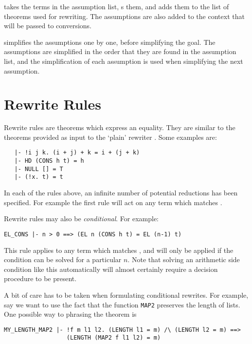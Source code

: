  takes the terms in the assumption list,
s them, and adds them to the list of theorems used for
rewriting. The assumptions are also added to the context that will be
passed to conversions.

 simplifies the assumptions one by one, before
simplifying the goal.  The assumptions are simplified in the order
that they are found in the assumption list, and the simplification
of each assumption is used when simplifying the next assumption.

\section{Rewrite Rules}

\label{rewrite-rules}

Rewrite rules are theorems which express an equality.  They
are similar to the theorems
provided as input to the `plain' rewriter
.  Some examples are:
\begin{hol}\begin{verbatim}
   |- !i j k. (i + j) + k = i + (j + k)
   |- HD (CONS h t) = h
   |- NULL [] = T
   |- (!x. t) = t
\end{verbatim}\end{hol}
In each of the rules above, an infinite number of potential
reductions has been specified.  For example the first rule
will act on any term which matches .

Rewrite rules may also be {\em conditional}.  For example:
\begin{hol}\begin{verbatim}
EL_CONS |- n > 0 ==> (EL n (CONS h t) = EL (n-1) t)
\end{verbatim}\end{hol}
This
rule applies to any term which matches ,
and will only be applied if the condition  can be
solved for a particular $n$.  Note that solving an arithmetic side condition
like this automatically will almost certainly
require a decision procedure to be present.

A bit of care has to be taken when formulating conditional rewrites.
For example, say we want to use the fact that the function {\tt MAP2}
preserves the length of lists. One possible way to phrasing the
theorem is
\begin{hol} \begin{verbatim}
MY_LENGTH_MAP2 |- !f m l1 l2. (LENGTH l1 = m) /\ (LENGTH l2 = m) ==>
                  (LENGTH (MAP2 f l1 l2) = m)
\end{verbatim} \end{hol}

